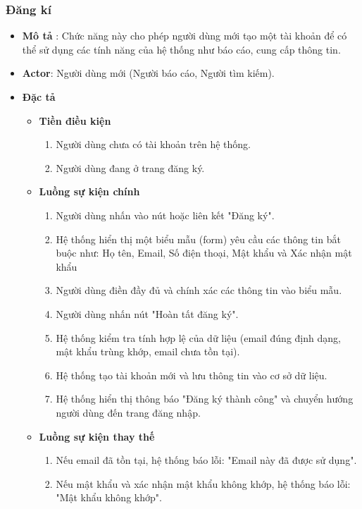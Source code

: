 \documentclass[../DoAn.tex]{subfiles}
\begin{document}
\subsubsection{Đăng kí}
\begin{itemize}
	\item \textbf{Mô tả} : Chức năng này cho phép người dùng mới tạo một tài khoản để có thể sử dụng các tính năng của hệ thống như báo cáo, cung cấp thông tin.
	\item \textbf{Actor}: Người dùng mới (Người báo cáo, Người tìm kiếm).
	\item \textbf{Đặc tả}
	      \begin{itemize}
		      \item \textbf{Tiền điều kiện}
		            \begin{enumerate}
			            \item Người dùng chưa có tài khoản trên hệ thống.
			            \item Người dùng đang ở trang đăng ký.
		            \end{enumerate}
		      \item \textbf{Luồng sự kiện chính}
		            \begin{enumerate}
			            \item Người dùng nhấn vào nút hoặc liên kết "Đăng ký".
			            \item Hệ thống hiển thị một biểu mẫu (form) yêu cầu các thông tin bắt buộc như: Họ tên, Email, Số điện thoại, Mật khẩu và Xác nhận mật khẩu
			            \item Người dùng điền đầy đủ và chính xác các thông tin vào biểu mẫu.
			            \item Người dùng nhấn nút "Hoàn tất đăng ký".
			            \item Hệ thống kiểm tra tính hợp lệ của dữ liệu (email đúng định dạng, mật khẩu trùng khớp, email chưa tồn tại).
			            \item Hệ thống tạo tài khoản mới và lưu thông tin vào cơ sở dữ liệu.
			            \item Hệ thống hiển thị thông báo "Đăng ký thành công" và chuyển hướng người dùng đến trang đăng nhập.
		            \end{enumerate}
		      \item \textbf{Luồng sự kiện thay thế}
		            \begin{enumerate}
			            \item Nếu email đã tồn tại, hệ thống báo lỗi: "Email này đã được sử dụng".
			            \item Nếu mật khẩu và xác nhận mật khẩu không khớp, hệ thống báo lỗi: "Mật khẩu không khớp".

\end{enumerate}
\end{itemize}
\end{itemize}
\end{document}

